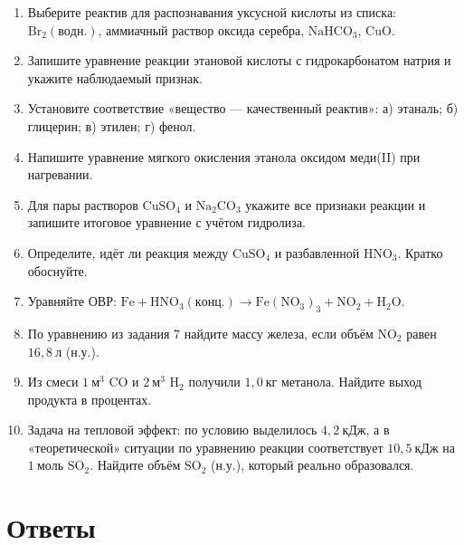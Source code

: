 \documentclass[a4paper,12pt]{article}
\begin{document}
\begin{enumerate}
    \item Выберите реактив для распознавания уксусной кислоты из списка:
    \(\mathrm{Br_2(водн.)}\), аммиачный раствор оксида серебра, \(\mathrm{NaHCO_3}\), \(\mathrm{CuO}\).

    \item Запишите уравнение реакции этановой кислоты с гидрокарбонатом натрия и укажите наблюдаемый признак.

    \item Установите соответствие «вещество --- качественный реактив»:
    а) этаналь; б) глицерин; в) этилен; г) фенол.

    \item Напишите уравнение мягкого окисления этанола оксидом меди(II) при нагревании.

    \item Для пары растворов \(\mathrm{CuSO_4}\) и \(\mathrm{Na_2CO_3}\) укажите все признаки реакции и запишите итоговое уравнение с учётом гидролиза.

    \item Определите, идёт ли реакция между \(\mathrm{CuSO_4}\) и разбавленной \(\mathrm{HNO_3}\). Кратко обоснуйте.

    \item Уравняйте ОВР:
    \(\mathrm{Fe + HNO_3(конц.) \rightarrow Fe(NO_3)_3 + NO_2 + H_2O}\).

    \item По уравнению из задания 7 найдите массу железа, если объём \(\mathrm{NO_2}\) равен \(16{,}8\ \mathrm{л}\) (н.у.).

    \item Из смеси \(1\ \mathrm{м^3}\) \(\mathrm{CO}\) и \(2\ \mathrm{м^3}\) \(\mathrm{H_2}\) получили \(1{,}0\ \mathrm{кг}\) метанола.
    Найдите выход продукта в процентах.

    \item Задача на тепловой эффект:
    по условию выделилось \(4{,}2\ \mathrm{кДж}\), а в «теоретической» ситуации по уравнению реакции соответствует \(10{,}5\ \mathrm{кДж}\) на \(1\ \mathrm{моль}\) \(\mathrm{SO_2}\).
    Найдите объём \(\mathrm{SO_2}\) (н.у.), который реально образовался.
\end{enumerate}

\newpage
\section*{Ответы}
\end{document}
